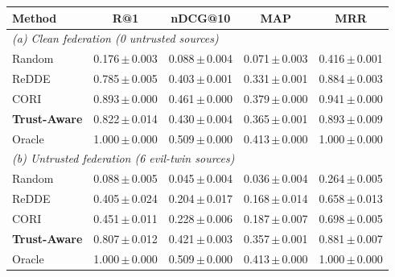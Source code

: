 \begin{tabular}{l cccc}
\toprule
Method & R@1 & nDCG@10 & MAP & MRR \\
\midrule
\multicolumn{5}{l}{\emph{(a) Clean federation (0 untrusted sources)}}\\
\midrule
Random & 0.176\,$\pm$\,0.003 & 0.088\,$\pm$\,0.004 & 0.071\,$\pm$\,0.003 & 0.416\,$\pm$\,0.001 \\
ReDDE & 0.785\,$\pm$\,0.005 & 0.403\,$\pm$\,0.001 & 0.331\,$\pm$\,0.001 & 0.884\,$\pm$\,0.003 \\
CORI & 0.893\,$\pm$\,0.000 & 0.461\,$\pm$\,0.000 & 0.379\,$\pm$\,0.000 & 0.941\,$\pm$\,0.000 \\
\textbf{Trust-Aware} & 0.822\,$\pm$\,0.014 & 0.430\,$\pm$\,0.004 & 0.365\,$\pm$\,0.001 & 0.893\,$\pm$\,0.009 \\
Oracle & 1.000\,$\pm$\,0.000 & 0.509\,$\pm$\,0.000 & 0.413\,$\pm$\,0.000 & 1.000\,$\pm$\,0.000 \\
\midrule
\multicolumn{5}{l}{\emph{(b) Untrusted federation (6 evil-twin sources)}}\\
\midrule
Random & 0.088\,$\pm$\,0.005 & 0.045\,$\pm$\,0.004 & 0.036\,$\pm$\,0.004 & 0.264\,$\pm$\,0.005 \\
ReDDE & 0.405\,$\pm$\,0.024 & 0.204\,$\pm$\,0.017 & 0.168\,$\pm$\,0.014 & 0.658\,$\pm$\,0.013 \\
CORI & 0.451\,$\pm$\,0.011 & 0.228\,$\pm$\,0.006 & 0.187\,$\pm$\,0.007 & 0.698\,$\pm$\,0.005 \\
\textbf{Trust-Aware} & 0.807\,$\pm$\,0.012 & 0.421\,$\pm$\,0.003 & 0.357\,$\pm$\,0.001 & 0.881\,$\pm$\,0.007 \\
Oracle & 1.000\,$\pm$\,0.000 & 0.509\,$\pm$\,0.000 & 0.413\,$\pm$\,0.000 & 1.000\,$\pm$\,0.000 \\
\bottomrule
\end{tabular}
